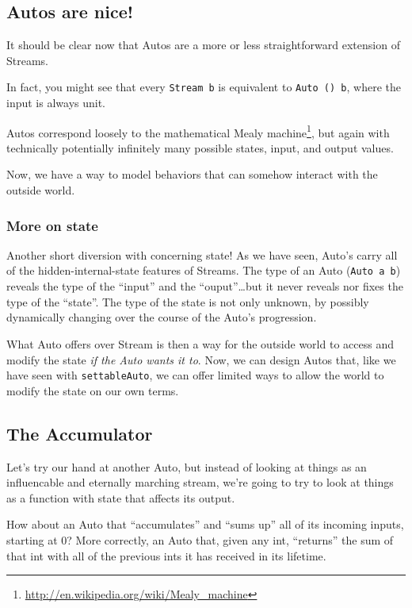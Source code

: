 \documentclass[]{article}
\renewcommand{\href}[2]{#2\footnote{\url{#1}}}
\begin{document}
\subsection{Autos are nice!}\label{autos-are-nice}

It should be clear now that Autos are a more or less straightforward extension of Streams.

In fact, you might see that every \texttt{Stream\ b} is equivalent to \texttt{Auto\ ()\ b}, where
the input is always unit.

Autos correspond loosely to the mathematical \href{http://en.wikipedia.org/wiki/Mealy_machine}{Mealy
machine}, but again with technically potentially infinitely many possible states, input, and output
values.

Now, we have a way to model behaviors that can somehow interact with the outside world.

\subsubsection{More on state}\label{more-on-state}

Another short diversion with concerning state! As we have seen, Auto's carry all of the
hidden-internal-state features of Streams. The type of an Auto (\texttt{Auto\ a\ b}) reveals the
type of the ``input'' and the ``ouput''\ldots{}but it never reveals nor fixes the type of the
``state''. The type of the state is not only unknown, by possibly dynamically changing over the
course of the Auto's progression.

What Auto offers over Stream is then a way for the outside world to access and modify the state
\emph{if the Auto wants it to}. Now, we can design Autos that, like we have seen with
\texttt{settableAuto}, we can offer limited ways to allow the world to modify the state on our own
terms.

\subsection{The Accumulator}\label{the-accumulator}

Let's try our hand at another Auto, but instead of looking at things as an influencable and
eternally marching stream, we're going to try to look at things as a function with state that
affects its output.

How about an Auto that ``accumulates'' and ``sums up'' all of its incoming inputs, starting at 0?
More correctly, an Auto that, given any int, ``returns'' the sum of that int with all of the
previous ints it has received in its lifetime.
\end{document}
